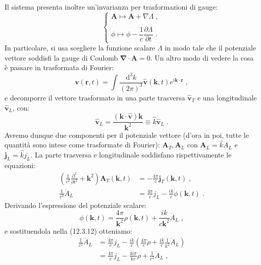 \documentclass[12pt,a4paper]{report}
\theoremstyle{definition}
\numberwithin{equation}{section}
\newcommand{\diff}[1][]{\mathrm{d}#1}
\newcommand{\bnabla}{\boldsymbol{\nabla}}
\begin{document}
Il sistema presenta inoltre un'invarianza per trasformazioni di gauge:
\begin{equation}
\begin{cases}
\mathbf{A}\longmapsto \mathbf{A}+\nabla\Lambda\;, \\
\\
\phi\longmapsto\phi-\dfrac{1}{c}\dfrac{\partial\Lambda}{\partial t}\;.
\end{cases}
\end{equation}
In particolare, si usa scegliere la funzione scalare $\Lambda$ in modo tale che il potenziale vettore soddisfi la gauge di Coulomb $\bnabla\cdot\mathbf{A}=0$. Un altro modo di vedere la cosa è passare in trasformata di Fourier:
\begin{equation}
\mathbf{v}(\mathbf{r},t)=\int\frac{\diff^3{k}}{(2\pi)^3}\hat{\mathbf{v}}(\mathbf{k},t)e^{i\mathbf{k}\cdot\mathbf{r}}\;,
\end{equation}
e decomporre il vettore trasformato in una parte trasversa $\hat{\mathbf{v}}_T$ e una longitudinale $\hat{\mathbf{v}}_L$, con:
\begin{equation}
\hat{\mathbf{v}}_L=\frac{(\mathbf{k}\cdot\hat{\mathbf{v}})\mathbf{k}}{\mathbf{k}^2}\equiv \hat{k}\hat{\mathbf{v}}_L\;.
\end{equation}
Avremo dunque due componenti per il potenziale vettore (d'ora in poi, tutte le quantità sono intese come trasformate di Fourier): $\mathbf{A}_T,\mathbf{A}_L$ con $\mathbf{A}_L=\hat{k}A_L$ e $\mathbf{j}_L=\hat{k}j_L$. La parte trasversa e longitudinale soddisfano rispettivamente le equazioni:
\begin{align}
\left(\frac{1}{c^2}\frac{\partial^2}{\partial t^2}+\mathbf{k}^2\right)\mathbf{A}_T(\mathbf{k},t)&=-\frac{4\pi}{c}\mathbf{j}_T(\mathbf{k},t)\;, \\
\frac{1}{c^2}\ddot{A}_L &= \frac{4\pi}{c}j_L-\frac{ik}{c}\dot{\phi}(\mathbf{k},t)\;.
\end{align}
Derivando l'espressione del potenziale scalare:
\begin{equation}
\phi(\mathbf{k},t)=\frac{4\pi}{\mathbf{k}^2}\rho(\mathbf{k},t)+\frac{ik}{c\mathbf{k}^2}\dot{A}_L\;,
\end{equation}
e sostituendola nella (12.3.12) otteniamo:
\begin{align*}
\frac{1}{c^2}\ddot{A}_L&=\frac{4\pi}{c}j_L-\frac{ik}{c}\left(\frac{4\pi}{c}\dot{\rho}+\frac{ik}{c}\frac{1}{k^2}\ddot{A}_L\right) \\
&= \frac{4\pi}{c}j_L-\frac{4i\pi}{kc}\dot{\rho}+\frac{1}{c^2}\ddot{A}_L\;,
\end{align*}
\end{document}
